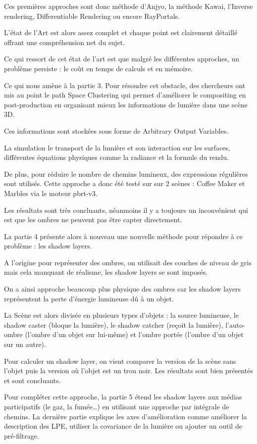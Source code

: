 \documentclass[runningheads]{llncs}
\begin{document}
Ces premières approches sont donc méthode d’Anjyo, la méthode Kawai, l’Inverse rendering, Differentiable Rendering ou encore RayPortals.

L’état de l’Art est alors assez complet et chaque point est clairement détaillé offrant une compréhension net du sujet.

Ce qui ressort de cet état de l’art est que malgré les différentes approches, un problème persiste : le coût en temps de calculs et en mémoire.

Ce qui nous amène à la partie 3. Pour résoudre cet obstacle, des chercheurs ont mis au point le path Space Clustering qui permet d’améliorer le compositing en post-production en organisant mieux les informations de lumière dans une scène 3D.

Ces informations sont stockées sous forme de Arbitrary Output Variables.

La simulation le transport de la lumière et son interaction sur les surfaces, différentes équations physiques comme la radiance et la formule du rendu.

De plus, pour réduire le nombre de chemins lumineux, des expressions régulières sont utilisés. Cette approche a donc été testé sur sur 2 scènes : Coffee Maker et Marbles via le moteur pbrt-v3.

Les résultats sont très concluants, néanmoins il y a toujours un inconvénient qui est que les ombres ne peuvent pas être capter directement.

La partie 4 présente alors à nouveau une nouvelle méthode pour répondre à ce problème : les shadow layers.

A l’origine pour représenter des ombres, on utilisait des couches de niveau de gris mais cela manquant de réalisme, les shadow layers se sont imposés.

On a ainsi approche beaucoup plus physique des ombres car les shadow layers représentent la perte d’énergie lumineuse dû à un objet.

La Scène est alors divisée en plusieurs types d’objets : la source lumineuse, le shadow caster (bloque la lumière), le shadow catcher (reçoit la lumière), l’auto-ombre (l’ombre d’un objet sur lui-même) et l’ombre portée (l’ombre d’un objet sur un autre).

Pour calculer un shadow layer, on vient comparer la version de la scène sans l’objet puis la version où l’objet est un trou noir. Les résultats sont bien présentés et sont concluants.

Pour compléter cette approche, la partie 5 étend les shadow layers aux médias participatifs (le gaz, la fumée…) en utilisant une approche par intégrale de chemins. La dernière partie explique les axes d’amélioration comme améliorer la description des LPE, utiliser la covariance de la lumière ou ajouter un outil de pré-filtrage.
\end{document}
